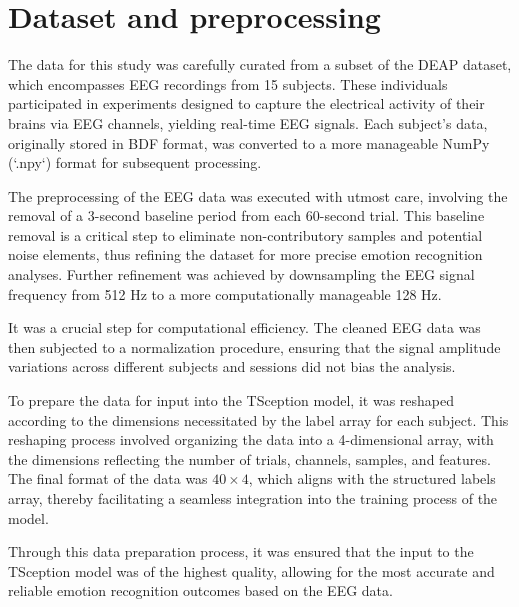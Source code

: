 \section{Dataset and preprocessing}
The data for this study was carefully curated from a subset of the DEAP dataset, which encompasses EEG recordings from 15 subjects. These individuals participated in experiments designed to capture the electrical activity of their brains via EEG channels, yielding real-time EEG signals. Each subject's data, originally stored in BDF format, was converted to a more manageable NumPy (`.npy`) format for subsequent processing. 

The preprocessing of the EEG data was executed with utmost care, involving the removal of a 3-second baseline period from each 60-second trial. This baseline removal is a critical step to eliminate non-contributory samples and potential noise elements, thus refining the dataset for more precise emotion recognition analyses. Further refinement was achieved by downsampling the EEG signal frequency from 512 Hz to a more computationally manageable 128 Hz. 

It was a crucial step for computational efficiency. The cleaned EEG data was then subjected to a normalization procedure, ensuring that the signal amplitude variations across different subjects and sessions did not bias the analysis. 

To prepare the data for input into the TSception model, it was reshaped according to the dimensions necessitated by the label array for each subject. This reshaping process involved organizing the data into a 4-dimensional array, with the dimensions reflecting the number of trials, channels, samples, and features. The final format of the data was \(40 \times 4\), which aligns with the structured labels array, thereby facilitating a seamless integration into the training process of the model. 

Through this data preparation process, it was ensured that the input to the TSception model was of the highest quality, allowing for the most accurate and reliable emotion recognition outcomes based on the EEG data.

